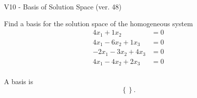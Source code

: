 \begin{exercise}
  \begin{exerciseTitle}V10 - Basis of Solution Space (ver. 48)\end{exerciseTitle}
  \begin{exerciseStatement}
    Find a basis for the solution space of the homogeneous system 
\begin{align*}
 4 x_ 1 + 1 x_ 2 &= 0  \\ 
  4 x_ 1 -6 x_ 2 + 1 x_ 3 &= 0  \\ 
  -2 x_ 1 -3 x_ 2 + 4 x_ 3 &= 0  \\ 
  4 x_ 1 -4 x_ 2 + 2 x_ 3 &= 0  \\ 
 \end{align*}


 
  \end{exerciseStatement}

  \begin{exerciseAnswer}
   A basis is   
\[\left\{\right\}.\]

  


  \end{exerciseAnswer}
\end{exercise}
